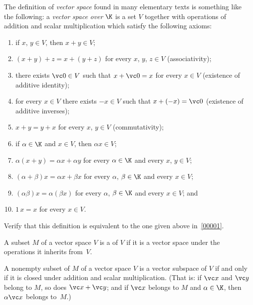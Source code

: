 \begin{exer} The definition of \emph{vector space} found in many elementary texts is
something like the following: a \emph{vector space over} $\K$ is a set $V$ together with operations
of addition and scalar multiplication which satisfy the following axioms:
 \begin{enumerate}
  \item[(1)] if $x$, $y \in V$, then $x + y \in V$;
  \item[(2)] $(x + y) + z = x + (y + z)$ for every
$x$, $y$, $z \in V$ (associativity);
  \item[(3)] there exists $\vc 0 \in V$ such that $x + \vc 0 = x$ for every
$x \in V$ (existence of additive identity);
  \item[(4)] for every $x\in V$ there exists $-x \in V$ such that
$x + (-x) = \vc 0$ (existence of additive inverses);
  \item[(5)] $x + y = y + x$ for every $x$, $y \in V$
(commutativity);
  \item[(6)] if $\alpha \in \K$ and $x \in V$, then $\alpha x \in V$;
  \item[(7)] $\alpha (x + y) = \alpha x + \alpha y$ for every $\alpha \in \K$
and every $x$, $y \in V$;
  \item[(8)] $(\alpha + \beta)x = \alpha x + \beta x$ for every $\alpha$,
$\beta \in \K$ and every $x \in V$;
  \item[(9)] $(\alpha\beta)x = \alpha(\beta x)$ for every $\alpha$,
$\beta \in \K$ and every $x \in V$; and
  \item[(10)] $1\,x = x$ for every $x \in V$.
 \end{enumerate}
Verify that this definition is equivalent to the one given above in~\ref{00001}.
\end{exer}

\begin{defn} A subset $M$ of a vector space $V$ is a
 of $V$ if it is a vector space under the operations it inherits from~$V$.
\end{defn}

\begin{prop} A nonempty subset of $M$ of a vector space $V$ is a vector subspace of $V$ if and
only if it is closed under addition and scalar multiplication. (That is: if $\vc x$ and
$\vc y$ belong to $M$, so does $\vc x + \vc y$; and if $\vc x$ belongs to $M$ and $\alpha
\in \K$, then $\alpha \vc x$ belongs to~$M$.)
\end{prop}

